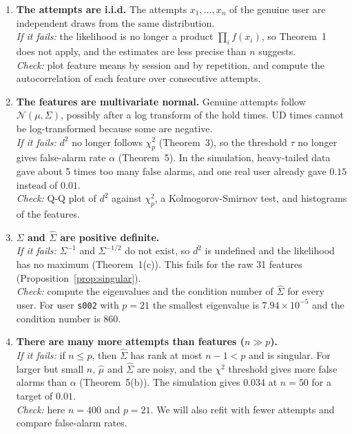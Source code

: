 \documentclass[11pt]{article}
\newcommand{\hSigma}{\hat{\Sigma}}
\newcommand{\hmu}{\hat{\mu}}
\theoremstyle{plain}
\theoremstyle{definition}
\theoremstyle{remark}
\begin{document}
\begin{enumerate}[label=\textbf{A\arabic*.},leftmargin=*,itemsep=8pt]
\item \textbf{The attempts are i.i.d.} The attempts $x_1,\dots,x_n$ of the genuine
  user are independent draws from the same distribution.\\
  \textit{If it fails:} the likelihood is no longer a product $\prod_i f(x_i)$, so
  Theorem~1 does not apply, and the estimates are less precise than $n$ suggests.\\
  \textit{Check:} plot feature means by session and by repetition, and compute the
  autocorrelation of each feature over consecutive attempts.

\item \textbf{The features are multivariate normal.} Genuine attempts follow
  $\mathcal N(\mu,\Sigma)$, possibly after a log transform of the hold times. UD
  times cannot be log-transformed because some are negative.\\
  \textit{If it fails:} $d^2$ no longer follows $\chi^2_p$ (Theorem~3), so the
  threshold $\tau$ no longer gives false-alarm rate $\alpha$ (Theorem~5). In the
  simulation, heavy-tailed data gave about 5 times too many false alarms, and one real
  user already gave $0.15$ instead of $0.01$.\\
  \textit{Check:} Q-Q plot of $d^2$ against $\chi^2_p$, a Kolmogorov-Smirnov test,
  and histograms of the features.

\item \textbf{$\Sigma$ and $\hSigma$ are positive definite.}\\
  \textit{If it fails:} $\Sigma^{-1}$ and $\Sigma^{-1/2}$ do not exist, so $d^2$ is
  undefined and the likelihood has no maximum (Theorem~1(c)). This fails for the raw
  31 features (Proposition~\ref{prop:singular}).\\
  \textit{Check:} compute the eigenvalues and the condition number of $\hSigma$ for
  every user. For user \texttt{s002} with $p=21$ the smallest eigenvalue is
  $7.94\times10^{-5}$ and the condition number is $860$.

\item \textbf{There are many more attempts than features ($n\gg p$).}\\
  \textit{If it fails:} if $n\le p$, then $\hSigma$ has rank at most $n-1<p$ and is
  singular. For larger but small $n$, $\hmu$ and $\hSigma$ are noisy, and the
  $\chi^2$ threshold gives more false alarms than $\alpha$ (Theorem~5(b)). The
  simulation gives $0.034$ at $n=50$ for a target of $0.01$.\\
  \textit{Check:} here $n=400$ and $p=21$. We will also refit with fewer attempts and
  compare false-alarm rates.


\end{enumerate}
\end{document}
